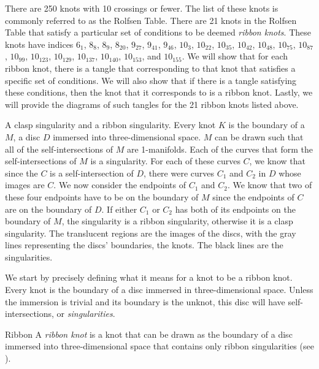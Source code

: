 \begin{paper}

There are 250 knots with 10 crossings or fewer.
The list of these knots is commonly referred to as the Rolfsen Table.
There are 21 knots in the Rolfsen Table that satisfy a particular set of
conditions to be deemed \textit{ribbon knots}.
These knots have indices $6_1$, $8_8$, $8_9$, $8_{20}$, $9_{27}$, $9_{41}$,
$9_{46}$, $10_3$, $10_{22}$, $10_{35}$, $10_{42}$, $10_{48}$, $10_{75}$,
$10_{87}$, $10_{99}$, $10_{123}$, $10_{129}$, $10_{137}$, $10_{140}$,
$10_{153}$, and $10_{155}$.
We will show that for each ribbon knot, there is a tangle that corresponding to
that knot that satisfies a specific set of conditions.
We will also show that if there is a tangle satisfying these conditions, then
the knot that it corresponds to is a ribbon knot.
Lastly, we will provide the diagrams of such tangles for the 21 ribbon knots
listed above.

{A clasp singularity and a ribbon singularity.
Every knot $K$ is the boundary of a $M$, a disc $D$ immersed into
three-dimensional space.
$M$ can be drawn such that all of the self-intersections of $M$ are 1-manifolds.
Each of the curves that form the self-intersections of $M$ is a singularity.
For each of these curves $C$, we know that since the $C$ is a self-intersection
of $D$, there were curves $C_1$ and $C_2$ in $D$ whose images are $C$.
We now consider the endpoints of $C_1$ and $C_2$.
We know that two of these four endpoints have to be on the boundary of $M$ since
the endpoints of $C$ are on the boundary of $D$.
If either $C_1$ or $C_2$ has both of its endpoints on the boundary of $M$, the
singularity is a ribbon singularity, otherwise it is a clasp singularity.
The translucent regions are the images of the discs, with the gray lines
representing the discs' boundaries, the knots.
The black lines are the singularities.}

We start by precisely defining what it means for a knot to be a ribbon knot.
Every knot is the boundary of a disc immersed in three-dimensional space.
Unless the immersion is trivial and its boundary is the unknot, this disc will
have self-intersections, or \textit{singularities}.

\begin{paperdef}{Ribbon}
A \textit{ribbon knot} is a knot that can be drawn as the boundary of a disc
immersed into three-dimensional space that contains only ribbon singularities
(see \figSingularities).
\end{paperdef}


\end{paper}
